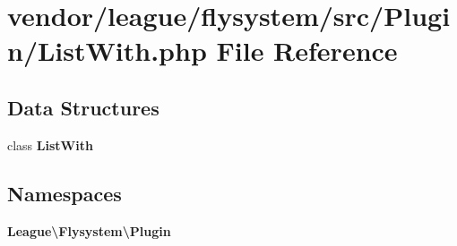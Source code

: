 \section{vendor/league/flysystem/src/\+Plugin/\+List\+With.php File Reference}
\label{_list_with_8php}
\subsection*{Data Structures}
\begin{DoxyCompactItemize}
\item 
class {\bf List\+With}
\end{DoxyCompactItemize}
\subsection*{Namespaces}
\begin{DoxyCompactItemize}
\item 
 {\bf League\textbackslash{}\+Flysystem\textbackslash{}\+Plugin}
\end{DoxyCompactItemize}
